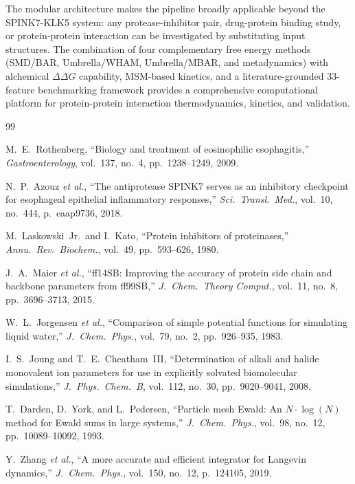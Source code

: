 \documentclass[conference]{IEEEtran}
\begin{document}
The modular architecture makes the pipeline broadly applicable beyond the
SPINK7-KLK5 system: any protease-inhibitor pair, drug-protein binding
study, or protein-protein interaction can be investigated by substituting
input structures.  The combination of four complementary free energy
methods (SMD/BAR, Umbrella/WHAM, Umbrella/MBAR, and metadynamics) with
alchemical $\Delta\Delta G$ capability, MSM-based kinetics, and a
literature-grounded 33-feature benchmarking framework provides a
comprehensive computational platform for protein-protein interaction
thermodynamics, kinetics, and validation.


\begin{thebibliography}{99}

M.~E.~Rothenberg,
``Biology and treatment of eosinophilic esophagitis,''
\textit{Gastroenterology}, vol.~137, no.~4, pp.~1238--1249, 2009.

N.~P.~Azouz \textit{et al.},
``The antiprotease SPINK7 serves as an inhibitory checkpoint for
esophageal epithelial inflammatory responses,''
\textit{Sci.\ Transl.\ Med.}, vol.~10, no.~444, p.~eaap9736, 2018.

M.~Laskowski~Jr.\ and I.~Kato,
``Protein inhibitors of proteinases,''
\textit{Annu.\ Rev.\ Biochem.}, vol.~49, pp.~593--626, 1980.

J.~A.~Maier \textit{et al.},
``ff14SB: Improving the accuracy of protein side chain and backbone
parameters from ff99SB,''
\textit{J.\ Chem.\ Theory Comput.}, vol.~11, no.~8, pp.~3696--3713, 2015.

W.~L.~Jorgensen \textit{et al.},
``Comparison of simple potential functions for simulating liquid water,''
\textit{J.\ Chem.\ Phys.}, vol.~79, no.~2, pp.~926--935, 1983.

I.~S.~Joung and T.~E.~Cheatham~III,
``Determination of alkali and halide monovalent ion parameters for use in
explicitly solvated biomolecular simulations,''
\textit{J.\ Phys.\ Chem.\ B}, vol.~112, no.~30, pp.~9020--9041, 2008.

T.~Darden, D.~York, and L.~Pedersen,
``Particle mesh Ewald: An $N \cdot \log(N)$ method for Ewald sums in
large systems,''
\textit{J.\ Chem.\ Phys.}, vol.~98, no.~12, pp.~10089--10092, 1993.

Y.~Zhang \textit{et al.},
``A more accurate and efficient integrator for Langevin dynamics,''
\textit{J.\ Chem.\ Phys.}, vol.~150, no.~12, p.~124105, 2019.


\end{thebibliography}
\end{document}
